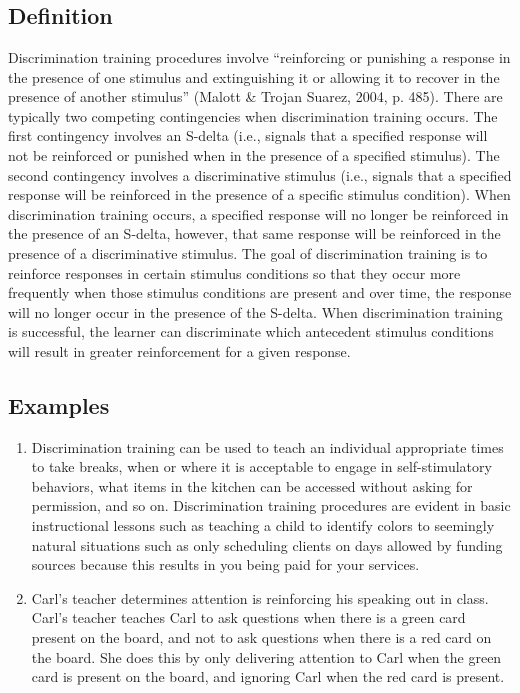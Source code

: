\clearpage \section{\foureTwo{}}
\subsection{Definition}
Discrimination training procedures involve ``reinforcing or punishing a response in the presence of one stimulus and extinguishing it or allowing it to recover in the presence of another stimulus'' (Malott \& Trojan Suarez, 2004, p. 485). There are typically two competing contingencies when discrimination training occurs.  The first contingency involves an S-delta (i.e., signals that a specified response will not be reinforced or punished when in the presence of a specified stimulus). The second contingency involves a discriminative stimulus (i.e., signals that a specified response will be reinforced in the presence of a specific stimulus condition). When discrimination training occurs, a specified response will no longer be reinforced in the presence of an S-delta, however, that same response will be reinforced in the presence of a discriminative stimulus. The goal of discrimination training is to reinforce responses in certain stimulus conditions so that they occur more frequently when those stimulus conditions are present and over time, the response will no longer occur in the presence of the S-delta. When discrimination training is successful, the learner can discriminate which antecedent stimulus conditions will result in greater reinforcement for a given response. 
%
\subsection{Examples}
\begin{enumerate}
\item Discrimination training can be used to teach an individual appropriate times to take breaks, when or where it is acceptable to engage in self-stimulatory behaviors, what items in the kitchen can be accessed without asking for permission, and so on. Discrimination training procedures are evident in basic instructional lessons such as teaching a child to identify colors to seemingly natural situations such as only scheduling clients on days allowed by funding sources because this results in you being paid for your services. 
\item Carl's teacher determines attention is reinforcing his speaking out in class. Carl's teacher teaches Carl to ask questions when there is a green card present on the board, and not to ask questions when there is a red card on the board. She does this by only delivering attention to Carl when the green card is present on the board, and ignoring Carl when the red card is present. 
\end{enumerate}
%
